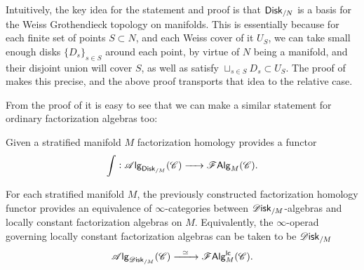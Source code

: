 \documentclass[../text]{subfiles}
\begin{document}
\begin{remark}
    Intuitively, the key idea for the statement and proof is that $\disk[r]_{/N}$ is a basis for the Weiss Grothendieck topology on manifolds. This is essentially because for each finite set of points $S \subset N$, and each Weiss cover of it $U_S$, we can take small enough disks $\{ D_s \}_{s \in S}$ around each point, by virtue of $N$ being a manifold, and their disjoint union will cover $S$, as well as satisfy $\sqcup_{s \in S} D_s \subset U_S$. The proof of \cite[prop.2.22]{af_primer} makes this precise, and the above proof transports that idea to the relative case.
\end{remark}

From the proof of  it is easy to see that we can make a similar statement for ordinary factorization algebras too:

\begin{corollary}\label{cor:fh_disk_to_falg}
    Given a stratified manifold $M$ factorization homology provides a functor
    \begin{equation}
        \int: \alg{\disk[r]_{/M}} (\catC) \xrightarrow{\ \ \ \ } \falg_{M} (\catC).
    \end{equation}
\end{corollary}

\begin{theorem}\label{thm:disk_alg=lcfa}
    For each stratified manifold $M$, the previously constructed factorization homology functor provides an equivalence of $\infty$-categories between $\disk_{/M}$-algebras and locally constant factorization algebras on $M$. Equivalently, the $\infty$-operad governing locally constant factorization algebras can be taken to be $\disk_{/M}$
    \begin{equation}
        \alg{\disk_{/M}} (\catC) \xrightarrow{\ \ \simeq \ \ } \lcfa_M (\catC).
    \end{equation}
\end{theorem}
\end{document}
